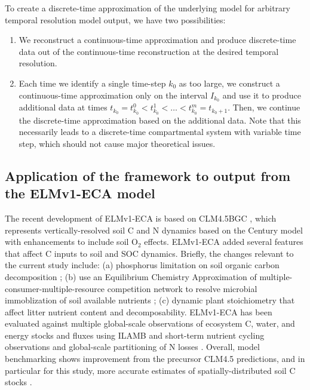 \documentclass[11pt,a4paper]{article}
\begin{document}
    To  create a discrete-time approximation of the underlying model for arbitrary temporal resolution model output, we have two possibilities:
    \begin{enumerate}[(1)]
        \item We reconstruct a continuous-time approximation and produce discrete-time data out of the continuous-time reconstruction at the desired temporal resolution.
        \item Each time we identify a single time-step $k_0$ as too large, we construct a continuous-time approximation only on the interval $I_{k_0}$ and use it to produce additional data at times $t_{k_0}=t_{k_0}^0<t_{k_0}^1<\ldots<t_{k_0}^m=t_{k_0+1}$.
        Then, we continue the discrete-time approximation based on the additional data.
        Note that this necessarily leads to a discrete-time compartmental system with variable time step, which should not cause major theoretical issues.
    \end{enumerate}


\subsection{Application of the framework to output from the ELMv1-ECA model}
    
    The recent development of ELMv1-ECA \citep{Zhu2019} is based on CLM4.5BGC \citep{Koven2013}, which represents vertically-resolved soil C and N dynamics based on the Century model \citep{Parton1993} with enhancements  to include soil O$_2$ effects. ELMv1-ECA added several features that affect C inputs to soil and SOC dynamics.  Briefly, the changes relevant to the current study include: (a) phosphorus limitation on soil organic carbon decomposition \citep{zhu2016bg}; (b) use an Equilibrium Chemistry Approximation of multiple-consumer-multiple-resource competition network to resolve microbial immoblization of soil available nutrients \citep{Tang2013, Zhu2017ea} ; (c) dynamic plant stoichiometry that affect litter nutrient content and decomposability. ELMv1-ECA has been evaluated against multiple global-scale observations of ecosystem C, water, and energy stocks and fluxes using ILAMB \citep{Collier2018, Zhu2019} and short-term nutrient cycling observations and global-scale partitioning of N losses \citep{Zhu2015ncc, Riley2018}. Overall, model benchmarking shows improvement from the precursor CLM4.5 predictions, and in particular for this study, more accurate estimates of spatially-distributed soil C stocks \citep{Zhu2019}.
    
\end{document}
